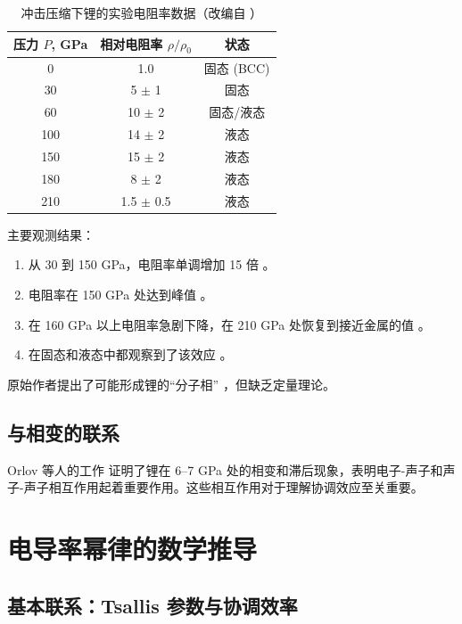 \documentclass[12pt,a4paper]{article}
\theoremstyle{remark}
\begin{document}
	\begin{table}[h]
		\centering
		\caption{冲击压缩下锂的实验电阻率数据（改编自 \cite{fortov2001, yakushev2002}）}
		\label{tab:exp_data}
		\begin{tabular}{ccc}
			\toprule
			压力 \(P\), GPa & 相对电阻率 \(\rho/\rho_0\) & 状态 \\
			\midrule
			0 & 1.0 & 固态 (BCC) \\
			30 & 5 \(\pm\) 1 & 固态 \\
			60 & 10 \(\pm\) 2 & 固态/液态 \\
			100 & 14 \(\pm\) 2 & 液态 \\
			150 & 15 \(\pm\) 2 & 液态 \\
			180 & 8 \(\pm\) 2 & 液态 \\
			210 & 1.5 \(\pm\) 0.5 & 液态 \\
			\bottomrule
		\end{tabular}
	\end{table}
	
	主要观测结果：
	\begin{enumerate}
		\item 从 30 到 150 GPa，电阻率单调增加 15 倍 \cite{fortov2001}。
		\item 电阻率在 150 GPa 处达到峰值 \cite{yakushev2002}。
		\item 在 160 GPa 以上电阻率急剧下降，在 210 GPa 处恢复到接近金属的值 \cite{yakushev2002}。
		\item 在固态和液态中都观察到了该效应 \cite{fortov2001}。
	\end{enumerate}
	
	原始作者提出了可能形成锂的“分子相” \cite{fortov1999}，但缺乏定量理论。
	
	\subsection{与相变的联系}
	
	Orlov 等人的工作 \cite{orlov2001} 证明了锂在 6–7 GPa 处的相变和滞后现象，表明电子-声子和声子-声子相互作用起着重要作用。这些相互作用对于理解协调效应至关重要。
	
	\section{电导率幂律的数学推导}
	
	\subsection{基本联系：Tsallis 参数与协调效率}
	
\end{document}
